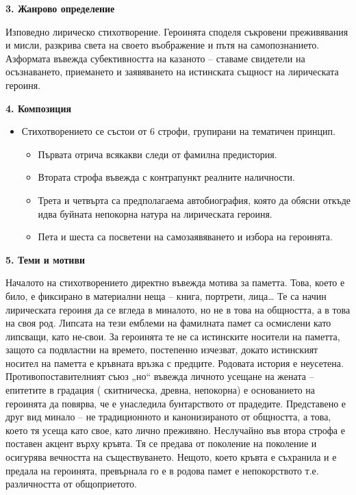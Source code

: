 \documentclass[12pt,a4paper]{article}
\begin{document}
\vspace{0.1cm}
\textbf{3. Жанрово определение}
\vspace{0.1cm}
 
\indent Изповедно лирическо стихотворение. Героинята споделя съкровени
преживявания и мисли, разкрива света на своето въображение и пътя на самопознанието. Азформата въвежда субективността на казаното – ставаме свидетели на осъзнаването, приемането и
заявяването на истинската същност на лирическата героиня.

\vspace{0.1cm}
\textbf{4. Композиция}
\vspace{0.1cm}

\begin{itemize}[leftmargin=*, noitemsep, topsep=2pt, parsep=0pt]
    \item Стихотворението се състои от 6 строфи, групирани на тематичен принцип.
    \begin{itemize}[leftmargin=*]
        \item Първата отрича всякакви следи от фамилна предистория.
        \item Втората строфа въвежда с контрапункт реалните наличности.
        \item Трета и четвърта са предполагаема автобиография, която да обясни откъде идва буйната непокорна натура на лирическата героиня.
        \item Пета и шеста са посветени на самозаявяването и избора на героинята.
    \end{itemize}
\end{itemize}

\vspace{0.1cm}
\textbf{5. Теми и мотиви}
\vspace{0.1cm}

\indent Началото на стихотворението директно въвежда мотива за паметта. Това, което е било, е фиксирано
в материални неща – книга, портрети, лица… Те са начин лирическата героиня да се вгледа в
миналото, но не в това на общността, а в това на своя род. Липсата на тези емблеми на фамилната
памет са осмислени като липсващи, като не-свои. За героинята те не са истинските носители на
паметта, защото са подвластни на времето, постепенно изчезват, докато истинският носител на
паметта е кръвната връзка с предците. Родовата история е неусетена. Противопоставителният съюз
„но“ въвежда личното усещане на жената – епитетите в градация ( скитническа, древна, непокорна) е
основанието на героинята да повярва, че е унаследила бунтарството от прадедите. Представено е
друг вид минало – не традиционното и канонизираното от общността, а това, което тя усеща като
свое, като лично преживяно. Неслучайно във втора строфа е поставен акцент върху кръвта. Тя се
предава от поколение на поколение и осигурява вечността на съществуването. Нещото, което кръвта
е съхранила и е предала на героинята, превърнала го е в родова памет е непокорството т.е.
различността от общоприетото.
\end{document}
